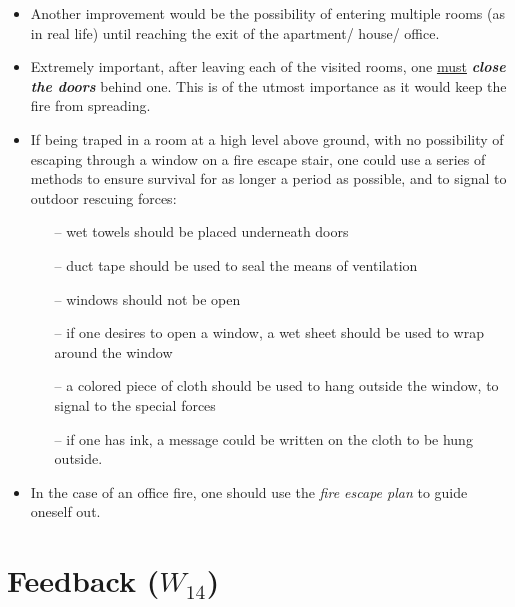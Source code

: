 \documentclass[a4paper,12pt]{report}
\begin{document}
\begin{itemize}
\item Another improvement would be the possibility of entering multiple rooms (as in real life) until reaching the exit of the apartment/ house/ office.

\item Extremely important, after leaving each of the visited rooms, one \underline{must} {\color{Red} \textit{\textbf{close the doors}}} behind one.
This is of the utmost importance as it would keep the fire from spreading.

\item If being traped in a room at a high level above ground, with no possibility of escaping through a window on a fire escape stair,
one could use a series of methods to ensure survival for as longer a period as possible, and to signal to outdoor rescuing forces:

\begin{itemize}
\item[--] wet towels should be placed underneath doors
\item[--] duct tape should be used to seal the means of ventilation
\item[--] windows should not be open
\item[--] if one desires to open a window, a wet sheet should be used to wrap around the window
\item[--] a colored piece of cloth should be used to hang outside the window, to signal to the special forces
\item[--] if one has ink, a message could be written on the cloth to be hung outside.
\end{itemize}

\item In the case of an office fire, one should use the {\it fire escape plan} to guide oneself out.
\end{itemize}




\chapter{Feedback ($W_{14}$)}


\end{document}
